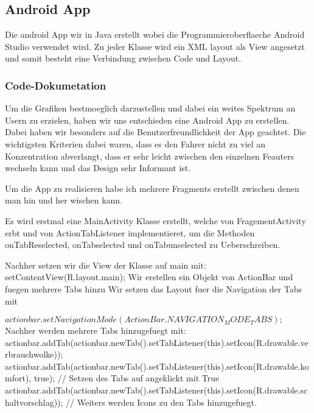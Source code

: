 \subsection{Android App}

Die android App wir in Java erstellt wobei die Programmieroberflaeche Android Studio verwendet wird.
Zu jeder Klasse wird ein XML layout als View angesetzt und somit besteht eine Verbindung zwischen Code und Layout.





\newpage
\subsubsection{Code-Dokumetation}

 Um die Grafiken bestmoeglich darzustellen und dabei ein weites Spektrum an Usern zu erzielen, haben wir uns entschieden eine Android App zu erstellen.
 Dabei haben wir besonders auf die Benutzerfreundlichkeit der App geachtet.
 Die wichtigsten Kriterien dabei waren, dass es den Fahrer nicht zu viel an Konzentration abverlangt, dass er sehr leicht zwischen den einzelnen Feauters wechseln kann und das Design sehr Informant ist.
 
 Um die App zu realisieren habe ich mehrere Fragments erstellt zwischen denen man hin und her wischen kann.
 
\newline

 Es wird erstmal eine MainActivity Klasse erstellt, welche von FragementActivity erbt und von ActionTabListener implementieret, um die Methoden onTabReselected, onTabselected und onTabunselected zu Ueberschreiben.   
 \newline
            
Nachher setzen wir die View der Klasse auf main mit:  
\newline            
setContentView(R.layout.main);
\newline
Wir erstellen ein Objekt von ActionBar und fuegen mehrere Tabs hinzu
Wir setzen das Layout fuer die Navigation der Tabs mit
 
\newline
$actionbar.setNavigationMode(ActionBar.NAVIGATION_MODE_TABS);$
\newline
Nachher werden  mehrere Tabs hinzugefuegt mit:
\newline
actionbar.addTab(actionbar.newTab().setTabListener(this).setIcon(R.drawable.verbrauchwolke));
\newline
actionbar.addTab(actionbar.newTab().setTabListener(this).setIcon(R.drawable.komfort), true);
\newline
// Setzen des Tabs auf angeklickt mit True
\newline
actionbar.addTab(actionbar.newTab().setTabListener(this).setIcon(R.drawable.schaltvorschlag));
\newline
// Weiters werden Icons zu den Tabs hinzugefuegt.
\newline

